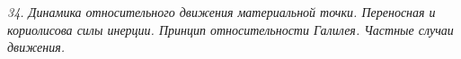 \emph{34. Динамика относительного движения материальной точки. Переносная и
кориолисова силы инерции. Принцип относительности Галилея. Частные случаи
движения.}

\newpage
